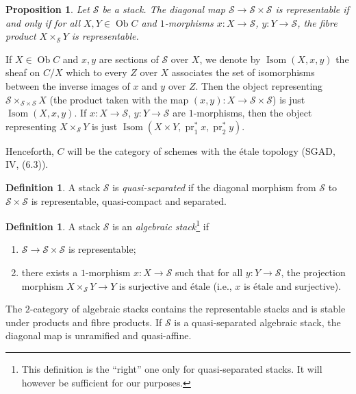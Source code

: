 \documentclass[10pt]{amsart}
\theoremstyle{plain}
\newtheorem{proposition}[theorem]{Proposition}
\theoremstyle{definition}
\newtheorem{definition}[theorem]{Definition}
\DeclareMathOperator{\Isom}{Isom}
\DeclareMathOperator{\Ob}{Ob}
\DeclareMathOperator{\pr}{pr}
\begin{document}
\begin{proposition}\label{prop:4.4}
Let $\mathscr{S}$ be a stack. The diagonal map $\mathscr{S} \to \mathscr{S} \times \mathscr{S}$ is representable if and only if for all $X, Y \in \Ob C$ and $1$-morphisms $x: X \to \mathscr{S}$, $y: Y \to \mathscr{S}$, the fibre product $X \times_{\mathscr{S}} Y$ is representable.
\end{proposition}

If $X \in \Ob C$ and $x, y$ are sections of $\mathscr{S}$ over $X$, we denote by $\Isom(X, x, y)$ the sheaf on $C/X$ which to every $Z$ over $X$ associates the set of isomorphisms between the inverse images of $x$ and $y$ over $Z$. Then the object representing $\mathscr{S} \times_{\mathscr{S} \times \mathscr{S}} X$ (the product taken with the map $(x,y): X \to \mathscr{S} \times \mathscr{S}$) is just $\Isom(X, x, y)$. If $x: X \to \mathscr{S}$, $y: Y \to \mathscr{S}$ are $1$-morphisms, then the object representing $X \times_{\mathscr{S}} Y$ is just $\Isom(X \times Y, \pr_1^* x, \pr_2^* y)$.

Henceforth, $C$ will be the category of schemes with the \'etale topology (SGAD, IV, (6.3)).

\begin{definition}\label{def:4.5}
A stack $\mathscr{S}$ is \emph{quasi-separated} if the diagonal morphism from $\mathscr{S}$ to $\mathscr{S} \times \mathscr{S}$ is representable, quasi-compact and separated.
\end{definition}

\begin{definition}\label{def:4.6}
A stack $\mathscr{S}$ is an \emph{algebraic stack}\footnote{This definition is the ``right'' one only for quasi-separated stacks. It will however be sufficient for our purposes.} if
\begin{enumerate}
\item[(i)] $\mathscr{S} \to \mathscr{S} \times \mathscr{S}$ is representable;
\item[(ii)] there exists a $1$-morphism $x: X \to \mathscr{S}$ such that for all $y: Y \to \mathscr{S}$, the projection morphism $X \times_{\mathscr{S}} Y \to Y$ is surjective and \'etale (i.e., $x$ is \'etale and surjective).
\end{enumerate}
\end{definition}

The $2$-category of algebraic stacks contains the representable stacks and is stable under products and fibre products. If $\mathscr{S}$ is a quasi-separated algebraic stack, the diagonal map is unramified and quasi-affine.
\end{document}
